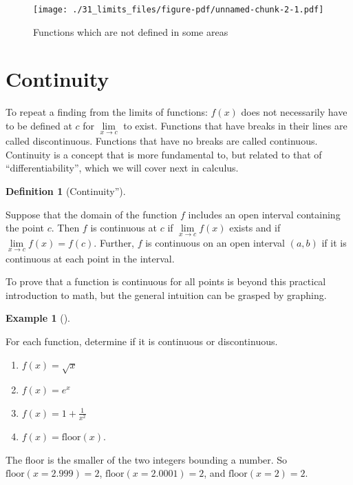 \documentclass[
  letterpaper,
]{book}
\providecommand{\tightlist}{%
  \setlength{\itemsep}{0pt}\setlength{\parskip}{0pt}}\usepackage{longtable,booktabs,array}
\theoremstyle{definition}
\newtheorem{definition}{Definition}[chapter]
\theoremstyle{definition}
\newtheorem{example}{Example}[chapter]
\theoremstyle{plain}
\theoremstyle{definition}
\theoremstyle{plain}
\theoremstyle{plain}
\theoremstyle{remark}
\begin{document}
\begin{figure}

{\centering \texttt{[image: ./31\_limits\_files/figure-pdf/unnamed-chunk-2-1.pdf]}

}

\caption{Functions which are not defined in some areas}

\end{figure}

\hypertarget{continuity}{%
\section{Continuity}\label{continuity}}

To repeat a finding from the limits of functions: \(f(x)\) does not
necessarily have to be defined at \(c\) for \(\lim\limits_{x \to c}\) to
exist. Functions that have breaks in their lines are called
discontinuous. Functions that have no breaks are called continuous.
Continuity is a concept that is more fundamental to, but related to that
of ``differentiability'', which we will cover next in calculus.

\leavevmode{}%
\begin{definition}[Continuity'']\label{def-conti}

Suppose that the domain of the function \(f\) includes an open interval
containing the point \(c\). Then \(f\) is continuous at \(c\) if
\(\lim\limits_{x \to c} f(x)\) exists and if
\(\lim\limits_{x \to c} f(x)=f(c)\). Further, \(f\) is continuous on an
open interval \((a,b)\) if it is continuous at each point in the
interval.

\end{definition}

To prove that a function is continuous for all points is beyond this
practical introduction to math, but the general intuition can be grasped
by graphing.

\leavevmode{}%
\begin{example}[]\label{exm-contdiscont}

For each function, determine if it is continuous or discontinuous.

\begin{enumerate}
\def\labelenumi{\arabic{enumi}.}
\tightlist
\item
  \(f(x) = \sqrt{x}\)
\item
  \(f(x) = e^x\)
\item
  \(f(x) = 1 + \frac{1}{x^2}\)
\item
  \(f(x) = \text{floor}(x)\).
\end{enumerate}

The floor is the smaller of the two integers bounding a number. So
\(\text{floor}(x = 2.999) = 2\), \(\text{floor}(x = 2.0001) = 2\), and
\(\text{floor}(x = 2) = 2.\)

\end{example}
\end{document}
